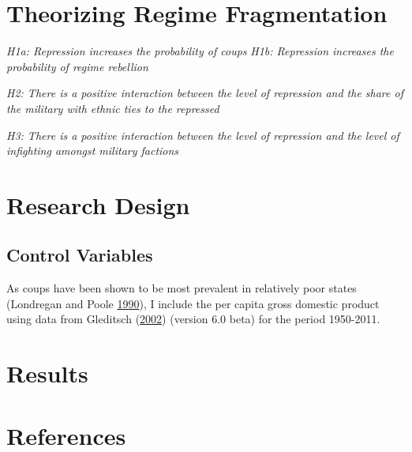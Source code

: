 \documentclass[12pt,]{article}
\theoremstyle{definition}
\theoremstyle{definition}
\theoremstyle{definition}
\theoremstyle{remark}
\begin{document}
\hypertarget{theorizing-regime-fragmentation}{%
\section{Theorizing Regime
Fragmentation}\label{theorizing-regime-fragmentation}}

\emph{H1a: Repression increases the probability of coups} \emph{H1b:
Repression increases the probability of regime rebellion}

\emph{H2: There is a positive interaction between the level of
repression and the share of the military with ethnic ties to the
repressed}

\emph{H3: There is a positive interaction between the level of
repression and the level of infighting amongst military factions}

\hypertarget{research-design}{%
\section{Research Design}\label{research-design}}

\hypertarget{control-variables}{%
\subsection{Control Variables}\label{control-variables}}

As coups have been shown to be most prevalent in relatively poor states
(Londregan and Poole \protect\hyperlink{ref-Londregan1990}{1990}), I
include the per capita gross domestic product using data from Gleditsch
(\protect\hyperlink{ref-Gleditsch2002a}{2002}) (version 6.0 beta) for
the period 1950-2011.

\hypertarget{results}{%
\section{Results}\label{results}}

\singlespacing



\doublespacing

\singlespacing



\doublespacing

\hypertarget{references}{%
\section*{References}\label{references}}
\end{document}
